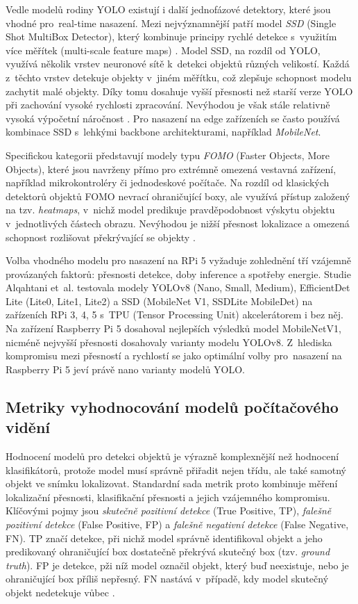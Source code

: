 Vedle modelů rodiny YOLO existují i další jednofázové detektory, které jsou vhodné pro~real-time nasazení. Mezi nejvýznamnější patří model \textit{SSD} (Single Shot MultiBox Detector), který kombinuje principy rychlé detekce s~využitím více měřítek (multi-scale feature maps) \cite{Liu2016}. Model SSD, na rozdíl od YOLO, využívá několik vrstev neuronové sítě k~detekci objektů různých velikostí. Každá z~těchto vrstev detekuje objekty v~jiném měřítku, což zlepšuje schopnost modelu zachytit malé objekty. Díky tomu dosahuje vyšší přesnosti než starší verze YOLO při zachování vysoké rychlosti zpracování. Nevýhodou je však stále relativně vysoká výpočetní náročnost \cite{Liu2016}. Pro nasazení na edge zařízeních se často používá kombinace SSD s~lehkými backbone architekturami, například \textit{MobileNet}.

Specifickou kategorii představují modely typu \textit{FOMO} (Faster Objects, More Objects), které jsou navrženy přímo pro extrémně omezená vestavná zařízení, například mikrokontroléry či jednodeskové počítače. Na rozdíl od klasických detektorů objektů FOMO nevrací ohraničující boxy, ale využívá přístup založený na tzv. \textit{heatmaps}, v~nichž model predikuje pravděpodobnost výskytu objektu v~jednotlivých částech obrazu. Nevýhodou je nižší přesnost lokalizace a omezená schopnost rozlišovat překrývající se objekty \cite{fomo}. 

Volba vhodného modelu pro nasazení na RPi 5 vyžaduje zohlednění tří vzájemně provázaných faktorů: přesnosti detekce, doby inference a spotřeby energie. Studie Alqahtani et~al. \cite{Alqahtani2025} testovala modely YOLOv8 (Nano, Small, Medium), EfficientDet Lite (Lite0, Lite1, Lite2) a SSD (MobileNet V1, SSDLite MobileDet) na zařízeních RPi 3, 4, 5 s~TPU (Tensor Processing Unit) akcelerátorem i bez něj. Na zařízení Raspberry Pi 5 dosahoval nejlepších výsledků model MobileNetV1, nicméně nejvyšší přesnosti dosahovaly varianty modelu YOLOv8. Z~hlediska kompromisu mezi přesností a rychlostí se jako optimální volby pro~nasazení na Raspberry Pi 5 jeví právě nano varianty modelů YOLO.

\subsection*{Metriky vyhodnocování modelů počítačového vidění}
Hodnocení modelů pro detekci objektů je výrazně komplexnější než hodnocení klasifikátorů, protože model musí správně přiřadit nejen třídu, ale také samotný objekt ve snímku lokalizovat. Standardní sada metrik proto kombinuje měření lokalizační přesnosti, klasifikační přesnosti a jejich vzájemného kompromisu. Klíčovými pojmy jsou \textit{skutečně pozitivní detekce} (True Positive, TP), \textit{falešně pozitivní detekce} (False Positive, FP) a \textit{falešně negativní detekce} (False Negative, FN). TP značí detekce, při nichž model správně identifikoval objekt a jeho predikovaný ohraničující box dostatečně překrývá skutečný box (tzv. \textit{ground truth}). FP je detekce, pži níž model označil objekt, který buď neexistuje, nebo je ohraničující box příliš nepřesný. FN nastává v~případě, kdy model skutečný objekt nedetekuje vůbec \cite{Padilla2020}.

